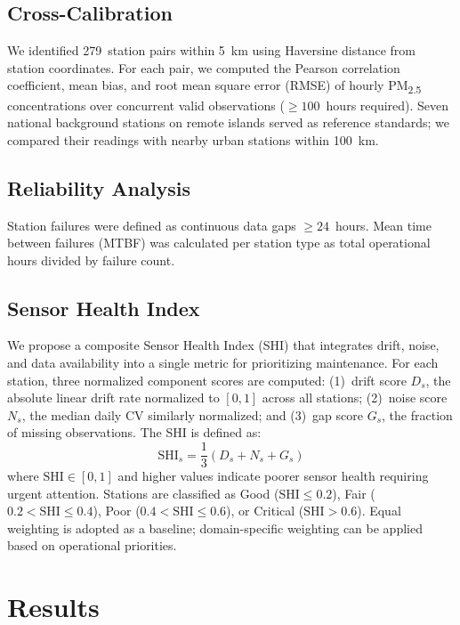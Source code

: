 \documentclass[12pt]{article}
\begin{document}
\subsection{Cross-Calibration}

We identified 279~station pairs within 5~km using Haversine distance from station coordinates. For each pair, we computed the Pearson correlation coefficient, mean bias, and root mean square error (RMSE) of hourly PM\textsubscript{2.5} concentrations over concurrent valid observations (${\geq}100$~hours required). Seven national background stations on remote islands served as reference standards; we compared their readings with nearby urban stations within 100~km.

\subsection{Reliability Analysis}

Station failures were defined as continuous data gaps ${\geq}24$~hours. Mean time between failures (MTBF) was calculated per station type as total operational hours divided by failure count.

\subsection{Sensor Health Index}

We propose a composite Sensor Health Index (SHI) that integrates drift, noise, and data availability into a single metric for prioritizing maintenance. For each station, three normalized component scores are computed: (1)~drift score $D_s$, the absolute linear drift rate normalized to $[0, 1]$ across all stations; (2)~noise score $N_s$, the median daily CV similarly normalized; and (3)~gap score $G_s$, the fraction of missing observations. The SHI is defined as:
\begin{equation}
\text{SHI}_s = \frac{1}{3}(D_s + N_s + G_s)
\label{eq:shi}
\end{equation}
where $\text{SHI} \in [0, 1]$ and higher values indicate poorer sensor health requiring urgent attention. Stations are classified as Good ($\text{SHI} \leq 0.2$), Fair ($0.2 < \text{SHI} \leq 0.4$), Poor ($0.4 < \text{SHI} \leq 0.6$), or Critical ($\text{SHI} > 0.6$). Equal weighting is adopted as a baseline; domain-specific weighting can be applied based on operational priorities.

\section{Results}
\end{document}
